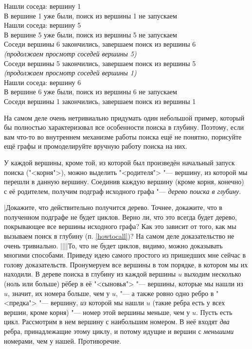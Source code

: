 {\ind \ind Нашли соседа: вершину 1\\
\ind \ind В вершине 1 уже были, поиск из вершины 1 не запускаем\\
\ind \ind Нашли соседа: вершину 5\\
\ind \ind В вершине 5 уже были, поиск из вершины 5 не запускаем\\
\ind \ind Соседи вершины 6 закончились, завершаем поиск из вершины 6\\
\ind \textit{(продолжаем просмотр соседей вершины 5)}\\
\ind Соседи вершины 5 закончились, завершаем поиск из вершины 5\\
\textit{(продолжаем просмотр соседей вершины 1)}\\
Нашли соседа: вершину 6\\\nopagebreak
В вершине 6 уже были, поиск из вершины 6 не запускаем\\\nopagebreak
Соседи вершины 1 закончились, завершаем поиск из вершины 1\\

}
\pagebreak[3]

На самом деле очень нетривиально придумать один небольшой пример, который бы полностью характеризовал все 
особенности поиска в глубину. Поэтому, если вам что-то во внутреннем механизме работы поиска ещё не 
понятно, порисуйте ещё графы и промоделируйте вручную работу поиска на них.

 У каждой вершины, кроме той, из которой был произведён начальный 
запуск поиска ("<корня">), можно выделить "<родителя"> "--- вершину, из которой мы перешли в данную вершину. 
Соединив каждую вершину (кроме корня, конечно) с её родителем, получим подграф исходного графа "--- 
\textit{дерево поиска в глубину}.

\task|Докажите, что действительно получится дерево. Точнее, докажите, что в полученном 
подграфе не будет циклов. Верно ли, что это всегда будет дерево, покрывающее все вершины исходного 
графа? Как это зависит от того, как мы вызываем поиск в глубину (п. \ref{howtocall})? На самом деле 
доказательство не очень тривиально.%
||||То, что не будет циклов, видимо, можно доказывать многими способами. Приведу идею
самого простого из пришедших мне сейчас в голову доказательств. Пронумеруем все вершины в том порядке, 
в котором мы их находили. В дереве поиска в глубину из каждой вершины $u$ выходим несколько (ноль или больше)
рёбер в её "<сыновья"> "--- вершины, которые мы нашли из $u$, значит, их номера больше, чем у $u$, "---
а также ровно одно ребро в "<предка"> "--- вершину, \textit{из} которой мы нашли $u$ (такие ребра есть
у всех вершин, кроме корня) "--- номер этой вершины меньше, чем у $u$. Пусть есть цикл. Рассмотрим в нем вершину с 
наибольшим номером. В неё входят \textit{два} ребра, принадлежащие этому циклу, и потому идущие и вершин с \textit{меньшими}
номерами, чем у нашей. Противоречие.

